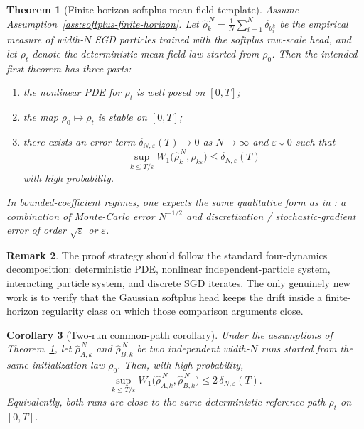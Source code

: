 \documentclass[11pt]{article}
\newtheorem{theorem}{Theorem}
\newtheorem{corollary}[theorem]{Corollary}
\theoremstyle{definition}
\newtheorem{remark}[theorem]{Remark}
\begin{document}
\begin{theorem}[Finite-horizon softplus mean-field template]
\label{thm:softplus-finite-horizon}
Assume Assumption~\ref{ass:softplus-finite-horizon}. Let
$\hat\rho_k^{\,N}=\frac1N\sum_{i=1}^N\delta_{\theta_i^k}$ be the empirical
measure of width-$N$ SGD particles trained with the softplus raw-scale head, and
let $\rho_t$ denote the deterministic mean-field law started from $\rho_0$.
Then the intended first theorem has three parts:
\begin{enumerate}[label=(\roman*)]
  \item the nonlinear PDE for $\rho_t$ is well posed on $[0,T]$;
  \item the map $\rho_0\mapsto \rho_t$ is stable on $[0,T]$;
  \item there exists an error term $\delta_{N,\varepsilon}(T)\to 0$ as
  $N\to\infty$ and $\varepsilon\downarrow 0$ such that
  \[
    \sup_{k\le T/\varepsilon}
    W_1\!\big(\hat\rho_k^{\,N},\rho_{k\varepsilon}\big)
    \le
    \delta_{N,\varepsilon}(T)
  \]
  with high probability.
\end{enumerate}
In bounded-coefficient regimes, one expects the same qualitative form as in
\cite{MeiMisiakiewiczMontanari2019}: a combination of Monte-Carlo error
$N^{-1/2}$ and discretization / stochastic-gradient error of order
$\sqrt{\varepsilon}$ or $\varepsilon$.
\end{theorem}

\begin{remark}
The proof strategy should follow the standard four-dynamics decomposition:
deterministic PDE, nonlinear independent-particle system, interacting particle
system, and discrete SGD iterates. The only genuinely new work is to verify that
the Gaussian softplus head keeps the drift inside a finite-horizon regularity
class on which those comparison arguments close.
\end{remark}

\begin{corollary}[Two-run common-path corollary]
\label{cor:two-run-common-path}
Under the assumptions of Theorem~\ref{thm:softplus-finite-horizon}, let
$\hat\rho_{A,k}^{\,N}$ and $\hat\rho_{B,k}^{\,N}$ be two independent width-$N$
runs started from the same initialization law $\rho_0$. Then, with high
probability,
\[
  \sup_{k\le T/\varepsilon}
  W_1\!\big(\hat\rho_{A,k}^{\,N},\hat\rho_{B,k}^{\,N}\big)
  \le
  2\,\delta_{N,\varepsilon}(T).
\]
Equivalently, both runs are close to the same deterministic reference path
$\rho_t$ on $[0,T]$.
\end{corollary}
\end{document}
